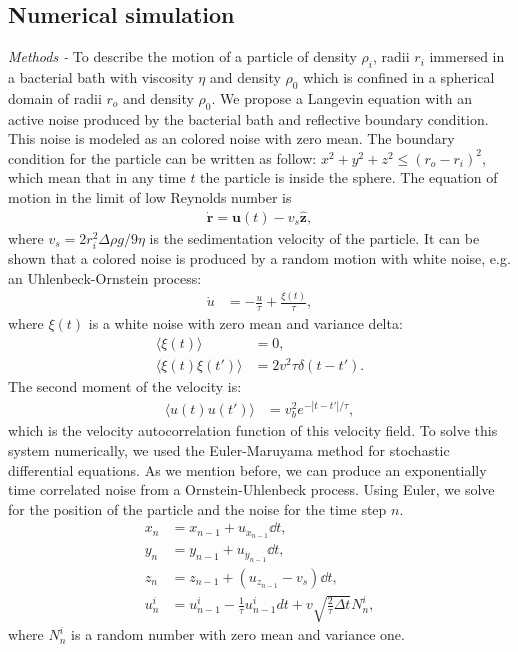 \documentclass[%
10pt,
superscriptaddress,
twocolumn,
 amsmath,amssymb,
 aps,prx,
]{revtex4-2}
\begin{document}
\subsection{Numerical simulation}
\textit{Methods - }To describe the motion of a particle of density $\rho_i$, radii $r_i$ immersed in a bacterial bath with viscosity $\eta$ and density $\rho_0$ which is confined in a spherical domain of radii $r_o$ and density $\rho_0$.
We propose a Langevin equation with an active noise produced by the bacterial bath and reflective boundary condition. 
This noise is modeled as an colored noise with zero mean.
The boundary condition for the particle can be written as follow: $x^2+y^2+z^2\leq (r_o-r_i)^2$, which mean that in any time $t$ the particle is inside the sphere.  
The equation of motion in the limit of low Reynolds number is 
\begin{align}\label{eq.Langevin_num}
  \mathbf{\dot{r}}=\mathbf{u}(t)-v_s\mathbf{\hat{z}},
\end{align}
where  $v_s=2 r_i^2 \Delta\rho g/9\eta$ is the sedimentation velocity of the particle.
It can be shown that a colored noise is produced by a random motion with white noise, e.g. an Uhlenbeck-Ornstein process:
\begin{align}\label{OUP}
  \dot{u}&=-\frac{u}{\tau}+\frac{\xi(t)}{\tau},
\end{align}
where $\xi(t)$ is a white noise with zero mean and variance delta:
\begin{align}
  \langle \xi(t)\rangle &=0,\\
  \langle \xi(t)\xi(t')\rangle &=2v^2\tau\delta(t-t').
\end{align}
The second moment of the velocity is:
\begin{align}
  \langle u(t)u(t')\rangle &=v_b^2e^{-|t-t'|/\tau},
\end{align}
which is the velocity autocorrelation function of this velocity field.
To solve this system numerically, we used the Euler-Maruyama method for stochastic differential equations.
As we mention before, we can produce an exponentially time correlated noise from a Ornstein-Uhlenbeck process.
Using Euler, we solve for the position of the particle and the noise for the time step $n$.
\begin{align}
   \label{eq:Euler_method}
   x_n&=x_{n-1}+u_{x_{n-1}}\dd t,\\
   y_n&=y_{n-1}+u_{y_{n-1}}\dd t,\\
   z_n&=z_{n-1}+(u_{z_{n-1}}-v_s)\dd t,\\
   u^i_{n}&=u^i_{n-1}-\frac{1}{\tau}u^i_{n-1}dt+v\sqrt{\frac{2}{\tau}\Delta t}N^i_{n},
\end{align}
where $N^{i}_n$ is a random number with zero mean and variance one.
\end{document}
